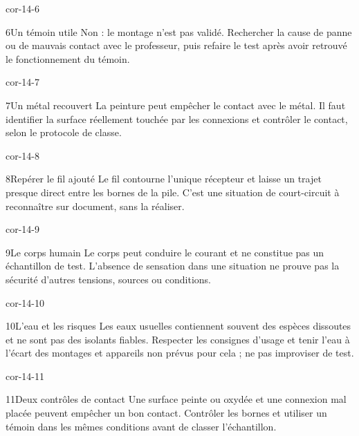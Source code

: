 \documentclass[12pt,twoside,openany]{book}
\begin{document}
\begin{blocLivre}{cor-14-6}
\begin{corrige}{6}{Un témoin utile}
Non : le montage n’est pas validé. Rechercher la cause de panne ou de mauvais contact avec le professeur, puis refaire le test après avoir retrouvé le fonctionnement du témoin.\par
\end{corrige}\end{blocLivre}
\begin{blocLivre}{cor-14-7}
\begin{corrige}{7}{Un métal recouvert}
La peinture peut empêcher le contact avec le métal. Il faut identifier la surface réellement touchée par les connexions et contrôler le contact, selon le protocole de classe.\par
\end{corrige}\end{blocLivre}
\begin{blocLivre}{cor-14-8}
\begin{corrige}{8}{Repérer le fil ajouté}
Le fil contourne l’unique récepteur et laisse un trajet presque direct entre les bornes de la pile. C’est une situation de court-circuit à reconnaître sur document, sans la réaliser.\par
{}
\end{corrige}\end{blocLivre}
\begin{blocLivre}{cor-14-9}
\begin{corrige}{9}{Le corps humain}
Le corps peut conduire le courant et ne constitue pas un échantillon de test. L’absence de sensation dans une situation ne prouve pas la sécurité d’autres tensions, sources ou conditions.\par
\end{corrige}\end{blocLivre}
\begin{blocLivre}{cor-14-10}
\begin{corrige}{10}{L’eau et les risques}
Les eaux usuelles contiennent souvent des espèces dissoutes et ne sont pas des isolants fiables. Respecter les consignes d’usage et tenir l’eau à l’écart des montages et appareils non prévus pour cela ; ne pas improviser de test.\par
\end{corrige}\end{blocLivre}
\begin{blocLivre}{cor-14-11}
\begin{corrige}{11}{Deux contrôles de contact}
Une surface peinte ou oxydée et une connexion mal placée peuvent empêcher un bon contact. Contrôler les bornes et utiliser un témoin dans les mêmes conditions avant de classer l’échantillon.\par
\end{corrige}\end{blocLivre}
\end{document}
